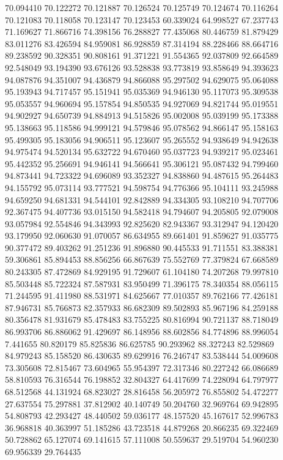70.094410
70.122272
70.121887
70.126524
70.125749
70.124674
70.116264
70.121083
70.118058
70.123147
70.123453
60.339024
64.998527
67.237743
71.169627
71.866716
74.398156
76.288827
77.435068
80.446759
81.879429
83.011276
83.426594
84.959081
86.928859
87.314194
88.228466
88.664716
89.238592
90.328351
90.808161
91.371221
91.554365
92.037809
92.664589
92.548049
93.194390
93.676126
93.528838
93.773819
93.858649
94.393623
94.087876
94.351007
94.436879
94.866088
95.297502
94.629075
95.064088
95.193943
94.717457
95.151941
95.035369
94.946130
95.117073
95.309538
95.053557
94.960694
95.157854
94.850535
94.927069
94.821744
95.019551
94.902927
94.650739
94.884913
94.515826
95.002008
95.039199
95.173388
95.138663
95.118586
94.999121
94.579846
95.078562
94.866147
95.158163
95.499305
95.183056
94.906511
95.123607
95.265552
94.938649
94.942638
94.975474
94.520134
95.632722
94.670460
95.037723
94.939217
95.023461
95.442352
95.256691
94.946141
94.566641
95.306121
95.087432
94.799460
94.873441
94.723322
94.696089
93.352327
94.838860
94.487615
95.264483
94.155792
95.073114
93.777521
94.598754
94.776366
95.104111
93.245988
94.659250
94.681331
94.544101
92.842889
94.334305
93.108210
94.707706
92.367475
94.407736
93.015150
94.582418
94.794607
94.205805
92.079008
93.057984
92.554846
94.343993
92.825620
82.943367
93.312947
94.120420
93.179950
92.060630
91.070057
86.634955
89.661401
91.859627
91.035775
90.377472
89.403262
91.251236
91.896880
90.445533
91.711551
83.388381
59.306861
85.894453
88.856256
66.867639
75.552769
77.379824
67.668589
80.243305
87.472869
84.929195
91.729607
61.104180
74.207268
79.997810
85.503448
85.722324
87.587931
83.950499
71.396175
78.340354
88.056115
71.244595
91.411980
88.531971
84.625667
77.010357
89.762166
77.426181
87.946731
85.766873
82.357933
86.682309
89.502893
85.967196
84.259188
80.356478
81.931679
85.478483
83.755225
80.816994
90.721137
88.718049
86.993706
86.886062
91.429697
86.148956
88.602856
84.774896
88.996054
7.441655
80.820179
85.825836
86.625785
90.293962
88.327243
82.529869
84.979243
85.158520
86.430635
89.629916
76.246747
83.538444
54.009608
73.305608
72.815467
73.604965
55.954397
72.317346
80.227242
66.086689
58.810593
76.316544
76.198852
32.804327
64.417699
74.228094
64.797977
68.512568
44.131924
68.823027
28.816458
56.205972
76.855802
54.472277
27.637554
75.297881
37.812902
40.140749
50.204760
32.969764
69.942895
54.808793
42.293427
48.440502
59.036177
48.157520
45.167617
52.996783
36.968818
40.363997
51.185286
43.723518
44.879268
20.866235
69.322469
50.728862
65.127074
69.141615
57.111008
50.559637
29.519704
54.960230
69.956339
29.764435
